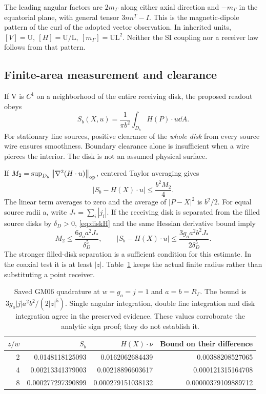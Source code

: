 The leading angular factors are \(2m_\Gamma\) along either axial direction and \(-m_\Gamma\) in the equatorial plane, with general tensor \(3nn^T-I\). This is the magnetic-dipole pattern of the curl of the adopted vector observation. In inherited units,
\([V]=\mathrm U,\ [H]=\mathrm U/\mathrm L,\ [m_\Gamma]=\mathrm U\mathrm L^2\).
Neither the SI coupling nor a receiver law follows from that pattern.

\subsection{Finite-area measurement and clearance}\label{sec:area}
If V is \(C^1\) on a neighborhood of the entire receiving disk, the proposed readout obeys
\begin{equation}\label{eq:stokes}
S_b(X,u)=\frac1{\pi b^2}\int_{D_b}H(P)\cdot u\dd A.
\end{equation}
For stationary line sources, positive clearance of the \emph{whole disk} from every source wire ensures smoothness. Boundary clearance alone is insufficient when a wire pierces the interior. The disk is not an assumed physical surface.

If \(M_2=\sup_{D_b}\left\lVert\nabla^2(H\cdot u)\right\rVert_{\rm op}\), centered Taylor averaging gives
\begin{equation}\label{eq:areaerror}
|S_b-H(X)\cdot u|\le\frac{b^2M_2}{4}.
\end{equation}
The linear term averages to zero and the average of \(|P-X|^2\) is \(b^2/2\). For equal source radii a, write \(J_*=\sum_i|j_i|\). If the receiving disk is separated from the filled source disks by \(\delta_D>0\), \eqref{eq:diskH} and the same Hessian derivative bound imply
\begin{equation}\label{eq:diskaveragebound}
M_2\le\frac{6g_oa^2J_*}{\delta_D^5},\qquad
|S_b-H(X)\cdot u|\le\frac{3g_oa^2b^2J_*}{2\delta_D^5}.
\end{equation}
The stronger filled-disk separation is a sufficient condition for this estimate. In the coaxial test it is at least \(|z|\). Table~\ref{tab:coax} keeps the actual finite radius rather than substituting a point receiver.

\begin{table}[tbp]\centering\small
\begin{tabular}{@{}rrrr@{}}\toprule
\(z/w\)&\(S_b\)&\(H(X)\cdot\nu\)&Bound on their difference\\\midrule
2&0.0148118125093&0.0162062684439&0.00388208527065\\
4&0.00213341379003&0.00218896603617&0.000121315164708\\
8&0.000277297390899&0.000279151038132&0.00000379109889712\\\bottomrule
\end{tabular}
\caption{Saved GM06 quadrature at \(w=g_o=j=1\) and \(a=b=R_\Gamma\). The bound is \(3g_o|j|a^2b^2/(2|z|^5)\). Single angular integration, double line integration and disk integration agree in the preserved evidence. These values corroborate the analytic sign proof; they do not establish it.}\label{tab:coax}
\end{table}
